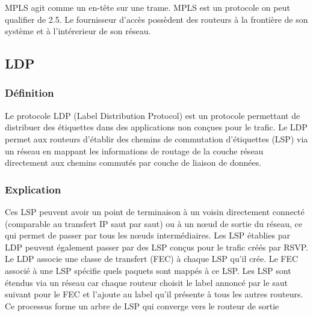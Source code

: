 \documentclass[12pt, a4paper]{article}
\begin{document}
    MPLS agit comme un en-tête sur une trame. MPLS est un protocole on peut 
    qualifier de 2.5. Le fournisseur d'accès possèdent des routeurs à la frontière
    de son système et à l'intérerieur de son réseau. 
\newpage

\subsection{LDP}
    \subsubsection{Définition}
    Le protocole LDP (Label Distribution Protocol) est un protocole permettant de 
    distribuer des étiquettes dans des applications non conçues pour le trafic. Le 
    LDP permet aux routeurs d’établir des chemins de commutation d’étiquettes (LSP) 
    via un réseau en mappant les informations de routage de la couche réseau 
    directement aux chemins commutés par couche de liaison de données.\\

    \subsubsection{Explication}
    Ces LSP peuvent avoir un point de terminaison à un voisin directement connecté 
    (comparable au transfert IP saut par saut) ou à un nœud de sortie du réseau, 
    ce qui permet de passer par tous les nœuds intermédiaires. Les LSP établies par 
    LDP peuvent également passer par des LSP conçus pour le trafic créés par RSVP.\\

    Le LDP associe une classe de transfert (FEC) à chaque LSP qu’il crée. Le FEC 
    associé à une LSP spécifie quels paquets sont mappés à ce LSP. Les LSP sont 
    étendus via un réseau car chaque routeur choisit le label annoncé par le 
    saut suivant pour le FEC et l’ajoute au label qu’il présente à tous les 
    autres routeurs. Ce processus forme un arbre de LSP qui converge vers le
    routeur de sortie\\
\end{document}
